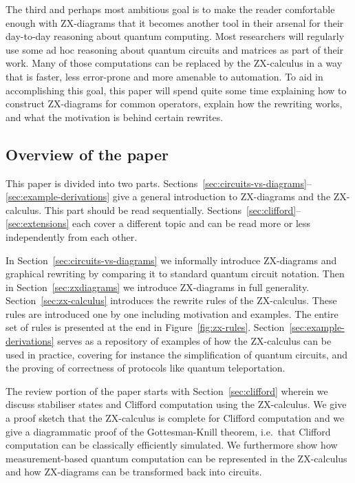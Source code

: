 \documentclass[a4paper,onecolumn,superscriptaddress,11pt,%
				unpublished,%
				allowfontchageintitle,%
				]{quantumarticle}
\begin{document}
The third and perhaps most ambitious goal is to make the reader comfortable enough with ZX-diagrams that it becomes another tool in their arsenal for their day-to-day reasoning about quantum computing. 
Most researchers will regularly use some ad hoc reasoning about quantum circuits and matrices as part of their work. Many of those computations can be replaced by the ZX-calculus in a way that is faster, less error-prone and more amenable to automation.
To aid in accomplishing this goal, this paper will spend quite some time explaining how to construct ZX-diagrams for common operators, explain how the rewriting works, and what the motivation is behind certain rewrites.

\subsection{Overview of the paper}

This paper is divided into two parts.
Sections~\ref{sec:circuits-vs-diagrams}--\ref{sec:example-derivations} give a general introduction to ZX-diagrams and the ZX-calculus. This part should be read sequentially.
Sections~\ref{sec:clifford}--\ref{sec:extensions} each cover a different topic and can be read more or less independently from each other.

In Section~\ref{sec:circuits-vs-diagrams} we informally introduce ZX-diagrams and graphical rewriting by comparing it to standard quantum circuit notation.
Then in Section~\ref{sec:zxdiagrams} we introduce ZX-diagrams in full generality.
Section~\ref{sec:zx-calculus} introduces the rewrite rules of the ZX-calculus. These rules are introduced one by one including motivation and examples. The entire set of rules is presented at the end in Figure~\ref{fig:zx-rules}.
Section~\ref{sec:example-derivations} serves as a repository of examples of how the ZX-calculus can be used in practice, covering for instance the simplification of quantum circuits, and the proving of correctness of protocols like quantum teleportation.

The review portion of the paper starts with Section~\ref{sec:clifford} wherein we discuss stabiliser states and Clifford computation using the ZX-calculus. We give a proof sketch that the ZX-calculus is complete for Clifford computation and we give a diagrammatic proof of the Gottesman-Knill theorem, i.e.~that Clifford computation can be classically efficiently simulated. We furthermore show how measurement-based quantum computation can be represented in the ZX-calculus and how ZX-diagrams can be transformed back into circuits.
\end{document}
